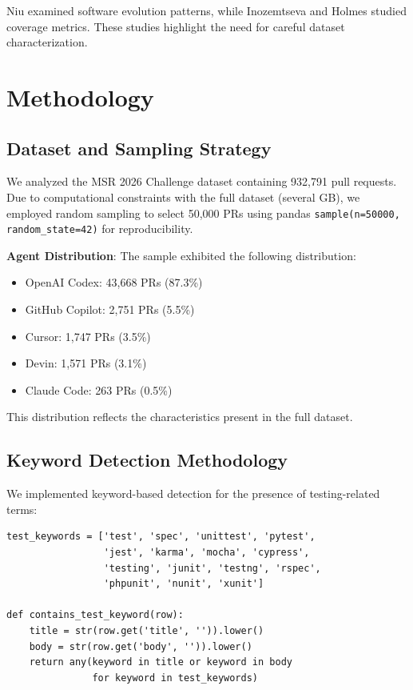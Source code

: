 \documentclass[conference]{IEEEtran}
\begin{document}
Niu \cite{niu2022role} examined software evolution patterns, while Inozemtseva and Holmes \cite{inozemtseva2014coverage} studied coverage metrics. These studies highlight the need for careful dataset characterization.

\section{Methodology}

\subsection{Dataset and Sampling Strategy}

We analyzed the MSR 2026 Challenge dataset containing 932,791 pull requests. Due to computational constraints with the full dataset (several GB), we employed random sampling to select 50,000 PRs using pandas \texttt{sample(n=50000, random\_state=42)} for reproducibility.

\textbf{Agent Distribution}: The sample exhibited the following distribution:
\begin{itemize}
    \item OpenAI Codex: 43,668 PRs (87.3\%)
    \item GitHub Copilot: 2,751 PRs (5.5\%)
    \item Cursor: 1,747 PRs (3.5\%)
    \item Devin: 1,571 PRs (3.1\%)
    \item Claude Code: 263 PRs (0.5\%)
\end{itemize}

This distribution reflects the characteristics present in the full dataset.

\subsection{Keyword Detection Methodology}

We implemented keyword-based detection for the presence of testing-related terms:

\begin{verbatim}
test_keywords = ['test', 'spec', 'unittest', 'pytest', 
                 'jest', 'karma', 'mocha', 'cypress', 
                 'testing', 'junit', 'testng', 'rspec',
                 'phpunit', 'nunit', 'xunit']

def contains_test_keyword(row):
    title = str(row.get('title', '')).lower()
    body = str(row.get('body', '')).lower()
    return any(keyword in title or keyword in body 
               for keyword in test_keywords)
\end{verbatim}
\end{document}
